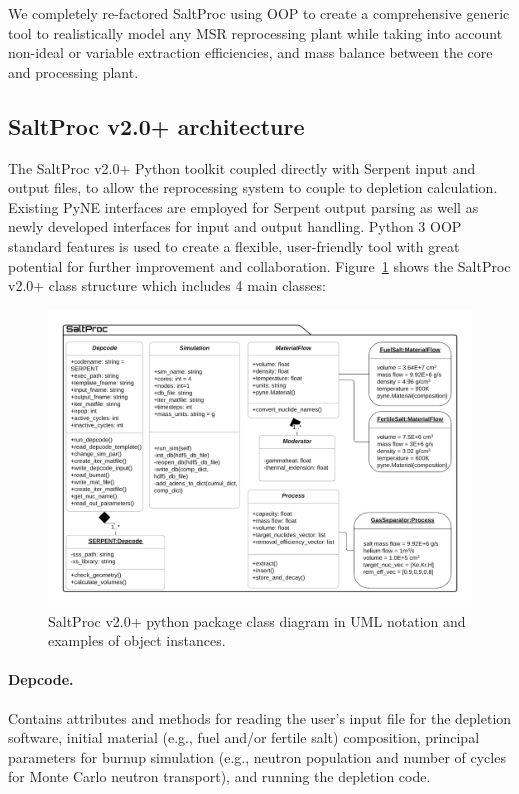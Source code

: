 \documentclass[12pt]{article} %
\begin{document}
We completely re-factored SaltProc using \gls{OOP} to create a 
comprehensive generic tool to realistically model any \gls{MSR} 
reprocessing plant while taking into account non-ideal or variable extraction 
efficiencies, and mass balance between the core and processing plant.

\subsection{SaltProc v2.0+ architecture}
The SaltProc v2.0+ Python toolkit coupled directly with Serpent input 
and output files, to allow the reprocessing system to couple to depletion calculation. 
Existing PyNE interfaces are employed for Serpent output parsing as 
well as newly developed interfaces for input and output handling. 
Python 3 \gls{OOP} standard features is used to create a flexible, 
user-friendly tool with great potential for further improvement and 
collaboration. 
Figure~\ref{fig:saltproc_class} shows the SaltProc v2.0+ class structure 
which includes 4 main classes:
\begin{figure}[ht!] %
  \includegraphics[width=1.07\textwidth]{saltproc_class_diagram.png}
  \caption{SaltProc v2.0+ python package class diagram in UML notation 
  and examples of object instances.}
  \label{fig:saltproc_class}
\end{figure}
	\paragraph{Depcode.}Contains attributes and methods for 
	reading the user's input file for the depletion software, initial 
	material (e.g., fuel and/or fertile salt) composition, principal 
	parameters for 
	burnup simulation (e.g., neutron population and number of cycles for Monte 
	Carlo neutron transport), and running the depletion code.
\end{document}
